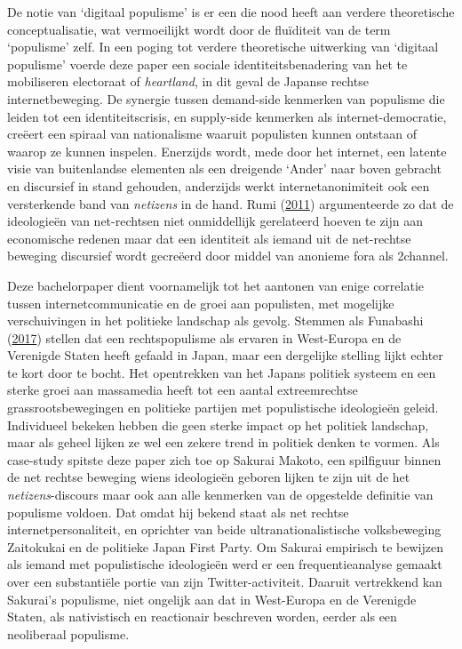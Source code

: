 \documentclass[10.5pt,dutch,]{article}
\begin{document}
De notie van `digitaal populisme' is er een die nood heeft aan verdere
theoretische conceptualisatie, wat vermoeilijkt wordt door de fluïditeit
van de term `populisme' zelf. In een poging tot verdere theoretische
uitwerking van `digitaal populisme' voerde deze paper een sociale
identiteitsbenadering van het te mobiliseren electoraat of
\emph{heartland}, in dit geval de Japanse rechtse internetbeweging. De
synergie tussen demand-side kenmerken van populisme die leiden tot een
identiteitscrisis, en supply-side kenmerken als internet-democratie,
creëert een spiraal van nationalisme waaruit populisten kunnen ontstaan
of waarop ze kunnen inspelen. Enerzijds wordt, mede door het internet,
een latente visie van buitenlandse elementen als een dreigende `Ander'
naar boven gebracht en discursief in stand gehouden, anderzijds werkt
internetanonimiteit ook een versterkende band van \emph{netizens} in de
hand. Rumi (\protect\hyperlink{ref-rumiux5fkoreansux5f2011}{2011})
argumenteerde zo dat de ideologieën van net-rechtsen niet onmiddellijk
gerelateerd hoeven te zijn aan economische redenen maar dat een
identiteit als iemand uit de net-rechtse beweging discursief wordt
gecreëerd door middel van anonieme fora als 2channel.

Deze bachelorpaper dient voornamelijk tot het aantonen van enige
correlatie tussen internetcommunicatie en de groei aan populisten, met
mogelijke verschuivingen in het politieke landschap als gevolg. Stemmen
als Funabashi (\protect\hyperlink{ref-funabashiux5fjapanux5f2017}{2017})
stellen dat een rechtspopulisme als ervaren in West-Europa en de
Verenigde Staten heeft gefaald in Japan, maar een dergelijke stelling
lijkt echter te kort door te bocht. Het opentrekken van het Japans
politiek systeem en een sterke groei aan massamedia heeft tot een aantal
extreemrechtse grassrootsbewegingen en politieke partijen met
populistische ideologieën geleid. Individueel bekeken hebben die geen
sterke impact op het politiek landschap, maar als geheel lijken ze wel
een zekere trend in politiek denken te vormen. Als case-study spitste
deze paper zich toe op Sakurai Makoto, een spilfiguur binnen de net
rechtse beweging wiens ideologieën geboren lijken te zijn uit de het
\emph{netizens}-discours maar ook aan alle kenmerken van de opgestelde
definitie van populisme voldoen. Dat omdat hij bekend staat als net
rechtse internetpersonaliteit, en oprichter van beide
ultranationalistische volksbeweging Zaitokukai en de politieke Japan
First Party. Om Sakurai empirisch te bewijzen als iemand met
populistische ideologieën werd er een frequentieanalyse gemaakt over een
substantiële portie van zijn Twitter-activiteit. Daaruit vertrekkend kan
Sakurai's populisme, niet ongelijk aan dat in West-Europa en de
Verenigde Staten, als nativistisch en reactionair beschreven worden,
eerder als een neoliberaal populisme.
\end{document}
